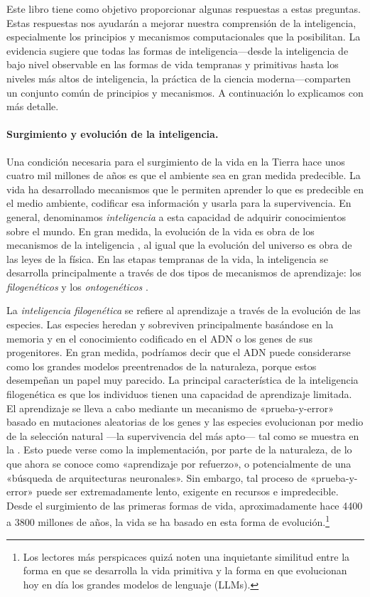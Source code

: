 \documentclass[../../book-main_es.tex]{subfiles}
\begin{document}
Este libro tiene como objetivo proporcionar algunas respuestas a estas preguntas. Estas
respuestas nos ayudarán a mejorar nuestra comprensión de la inteligencia,
especialmente los principios y mecanismos computacionales
que la posibilitan. La evidencia sugiere que todas las formas de 
inteligencia---desde la inteligencia de bajo nivel observable en las formas
de vida tempranas y primitivas hasta los niveles más altos de inteligencia,
la práctica de la ciencia moderna---comparten un conjunto común de principios y
mecanismos. A continuación lo explicamos con más detalle.

\paragraph{Surgimiento y evolución de la inteligencia.}

Una condición necesaria para el surgimiento de la vida en la Tierra hace unos 
cuatro mil millones de años es que el ambiente sea en gran
medida predecible. La vida ha desarrollado mecanismos que le permiten
aprender lo que es predecible en el medio ambiente, codificar esa 
información y usarla para la supervivencia. En general, denominamos \textit{inteligencia}
a esta capacidad de adquirir conocimientos sobre el mundo.
En gran medida, la evolución de la vida es obra 
de los mecanismos de la inteligencia \cite{Bennett-2023}, al igual que la evolución
del universo es obra de las leyes de la física. En las etapas
tempranas de la vida, la inteligencia se desarrolla principalmente a 
través de dos tipos de mecanismos de aprendizaje: los 
\textit{filogenéticos} y los \textit{ontogenéticos} \cite{Wiener-Cybernetics-1961}.

La \textit{inteligencia filogenética} se refiere al aprendizaje a través de la
evolución de las especies. Las especies heredan y sobreviven principalmente basándose
en la memoria y en el conocimiento codificado en el ADN o los genes de sus progenitores.
En gran medida, podríamos decir que el ADN puede considerarse como los grandes modelos preentrenados
de la naturaleza, porque estos desempeñan un papel muy parecido. La principal
característica de la inteligencia filogenética es que los individuos tienen una
capacidad de aprendizaje limitada. El aprendizaje se lleva a cabo mediante un mecanismo
de «prueba-y-error» basado en mutaciones aleatorias de los genes y las especies 
evolucionan por medio de la selección natural ---la supervivencia del más apto---
tal como se muestra en la . Esto puede verse como la implementación,
por parte de la naturaleza, de lo que ahora se conoce como «aprendizaje por refuerzo»,
\cite{Sutton-Barto} o potencialmente de una «búsqueda de arquitecturas neuronales»\cite{NAS-1}. 
Sin embargo, tal proceso de «prueba-y-error» puede ser extremadamente lento, exigente en recursos e
impredecible. Desde el surgimiento de las primeras formas de vida, aproximadamente hace 4400 a 3800 
millones de años\citep{bell2015potentially}, la vida se ha basado en esta forma
de evolución.\footnote{Los lectores más perspicaces quizá noten una inquietante similitud
entre la forma en que se desarrolla la vida primitiva y la forma en que evolucionan hoy en 
día los grandes modelos de lenguaje (LLMs).}
\end{document}
